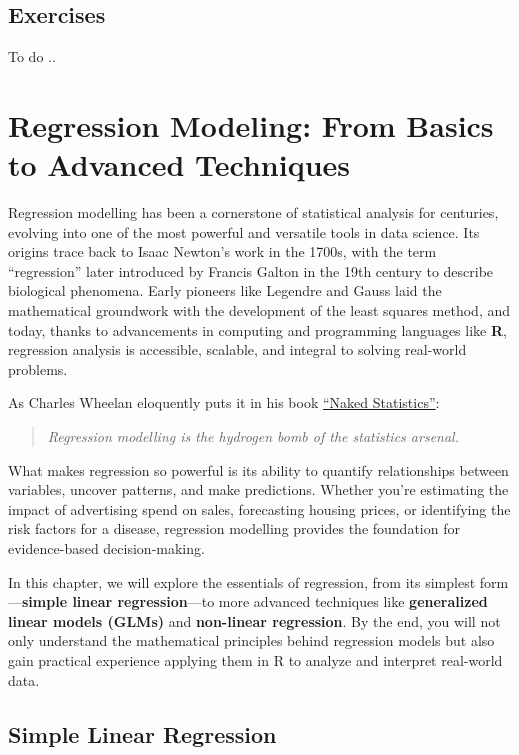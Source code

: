 \documentclass[
]{book}
\theoremstyle{definition}
\theoremstyle{definition}
\theoremstyle{definition}
\theoremstyle{definition}
\theoremstyle{remark}
\begin{document}
\section{Exercises}\label{exercises-7}

To do ..

\chapter{Regression Modeling: From Basics to Advanced Techniques}\label{chapter-regression}

Regression modelling has been a cornerstone of statistical analysis for centuries, evolving into one of the most powerful and versatile tools in data science. Its origins trace back to Isaac Newton's work in the 1700s, with the term ``regression'' later introduced by Francis Galton in the 19th century to describe biological phenomena. Early pioneers like Legendre and Gauss laid the mathematical groundwork with the development of the least squares method, and today, thanks to advancements in computing and programming languages like \textbf{R}, regression analysis is accessible, scalable, and integral to solving real-world problems.

As Charles Wheelan eloquently puts it in his book \href{https://www.goodreads.com/book/show/15786586-naked-statistics}{``Naked Statistics''}:

\begin{quote}
\emph{Regression modelling is the hydrogen bomb of the statistics arsenal.}
\end{quote}

What makes regression so powerful is its ability to quantify relationships between variables, uncover patterns, and make predictions. Whether you're estimating the impact of advertising spend on sales, forecasting housing prices, or identifying the risk factors for a disease, regression modelling provides the foundation for evidence-based decision-making.

In this chapter, we will explore the essentials of regression, from its simplest form---\textbf{simple linear regression}---to more advanced techniques like \textbf{generalized linear models (GLMs)} and \textbf{non-linear regression}. By the end, you will not only understand the mathematical principles behind regression models but also gain practical experience applying them in R to analyze and interpret real-world data.

\section{Simple Linear Regression}\label{sec-simple-regression}
\end{document}
